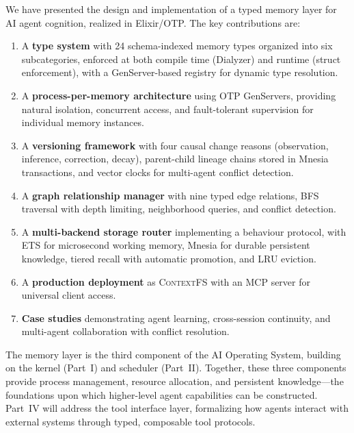 \documentclass[12pt,a4paper]{article}
\theoremstyle{definition}
\newcommand{\ContextFS}{\textsc{ContextFS}}
\begin{document}
We have presented the design and implementation of a typed memory layer for AI agent cognition, realized in Elixir/OTP.
The key contributions are:

\begin{enumerate}
  \item A \textbf{type system} with 24 schema-indexed memory types organized into six subcategories, enforced at both compile time (Dialyzer) and runtime (struct enforcement), with a GenServer-based registry for dynamic type resolution.

  \item A \textbf{process-per-memory architecture} using OTP GenServers, providing natural isolation, concurrent access, and fault-tolerant supervision for individual memory instances.

  \item A \textbf{versioning framework} with four causal change reasons (observation, inference, correction, decay), parent-child lineage chains stored in Mnesia transactions, and vector clocks for multi-agent conflict detection.

  \item A \textbf{graph relationship manager} with nine typed edge relations, BFS traversal with depth limiting, neighborhood queries, and conflict detection.

  \item A \textbf{multi-backend storage router} implementing a behaviour protocol, with ETS for microsecond working memory, Mnesia for durable persistent knowledge, tiered recall with automatic promotion, and LRU eviction.

  \item A \textbf{production deployment} as \ContextFS{} with an MCP server for universal client access.

  \item \textbf{Case studies} demonstrating agent learning, cross-session continuity, and multi-agent collaboration with conflict resolution.
\end{enumerate}

The memory layer is the third component of the AI Operating System, building on the kernel (Part~I) and scheduler (Part~II).
Together, these three components provide process management, resource allocation, and persistent knowledge---the foundations upon which higher-level agent capabilities can be constructed.
Part~IV will address the tool interface layer, formalizing how agents interact with external systems through typed, composable tool protocols.
\end{document}

